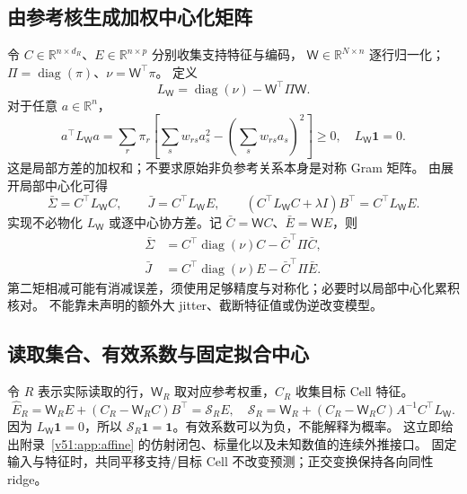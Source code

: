 \documentclass[11pt,UTF8,fontset=fandol]{ctexart}
\numberwithin{equation}{section}
\theoremstyle{definition}
\begin{document}
\subsection{由参考核生成加权中心化矩阵}
令 $C\in\mathbb R^{n\times d_R}$、$E\in\mathbb R^{n\times p}$ 分别收集支持特征与编码，
$\mathsf W\in\mathbb R^{N\times n}$ 逐行归一化；$\Pi=\operatorname{diag}(\pi)$、$\nu=\mathsf W^\top\pi$。
定义
\begin{equation}
 L_{\mathsf W}=\operatorname{diag}(\nu)-\mathsf W^\top\Pi \mathsf W.
 \label{v51:eq:kernel-centering}
\end{equation}
对于任意 $a\in\mathbb R^n$，
\begin{equation}
 a^\top L_{\mathsf W} a=\sum_r\pi_r\left[\sum_s w_{rs}a_s^2-(\sum_s w_{rs}a_s)^2\right]\ge0,
 \quad L_{\mathsf W}\bm1=0.
 \label{v51:eq:centering-psd}
\end{equation}
这是局部方差的加权和；不要求原始非负参考关系本身是对称 Gram 矩阵。
由展开局部中心化可得
\begin{equation}
 \bar\Sigma=C^\top L_{\mathsf W}C,\qquad\bar J=C^\top L_{\mathsf W}E,\qquad
 (C^\top L_{\mathsf W}C+\lambda I)B^\top=C^\top L_{\mathsf W}E.
 \label{v51:eq:kernel-normal}
\end{equation}
实现不必物化 $L_{\mathsf W}$ 或逐中心协方差。记 $\bar C=\mathsf W C$、$\bar E=\mathsf W E$，则
\begin{equation}
 \begin{aligned}
 \bar\Sigma&=C^\top\operatorname{diag}(\nu)C-\bar C^\top\Pi\bar C,\\
 \bar J&=C^\top\operatorname{diag}(\nu)E-\bar C^\top\Pi\bar E.
 \end{aligned}
 \label{v51:eq:efficient-moments}
\end{equation}
第二矩相减可能有消减误差，须使用足够精度与对称化；必要时以局部中心化累积核对。
不能靠未声明的额外大 jitter、截断特征值或伪逆改变模型。

\subsection{读取集合、有效系数与固定拟合中心}
令 $R$ 表示实际读取的行，$\mathsf W_R$ 取对应参考权重，$C_R$ 收集目标 Cell 特征。
\begin{equation}
 \widehat E_R=\mathsf W_R E+(C_R-\mathsf W_R C)B^\top=\mathcal S_R E,
 \quad
 \mathcal S_R=\mathsf W_R+(C_R-\mathsf W_R C)A^{-1}C^\top L_{\mathsf W}.
 \label{v51:eq:shared-effective}
\end{equation}
因为 $L_{\mathsf W}\bm1=0$，所以 $\mathcal S_R\bm1=\bm1$。有效系数可以为负，不能解释为概率。
这立即给出附录~\ref{v51:app:affine} 的仿射闭包、标量化以及未知数值的连续外推接口。
固定输入与特征时，共同平移支持/目标 Cell 不改变预测；正交变换保持各向同性 ridge。
\end{document}
